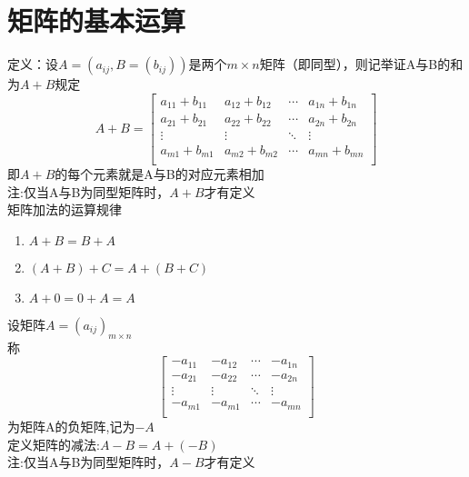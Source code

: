 \section{矩阵的基本运算}
{\color{red}定义：}设$A=(a_{ij},B=(b_{ij}))$是两个$m\times n$矩阵（即同型），则记举证A与B的和为$A+B$规定
$$
A+B=\left[ \begin{matrix}
    {{a}_{11}}+{{b}_{11}} & {{a}_{12}}+{{b}_{12}} & \cdots  & {{a}_{1n}}+{{b}_{1n}}  \\
   {{a}_{21}}+{{b}_{21}} & {{a}_{22}}+{{b}_{22}} & \cdots  & {{a}_{2n}}+{{b}_{2n}}  \\
   \vdots  & \vdots  & {\ddots} & \vdots   \\
   {{a}_{m1}}+{{b}_{m1}} & {{a}_{m2}}+{{b}_{m2}} & \cdots  & {{a}_{mn}}+{{b}_{mn}}  \\      
\end{matrix} \right]
$$
即$A+B$的每个元素就是A与B的对应元素相加\\
{\color{red}注:\quad}仅当A与B为同型矩阵时，$A+B$才有定义\\
矩阵加法的运算规律
\begin{enumerate}
    \item{
        $A+B=B+A$
    }
    \item{
        $(A+B)+C=A+(B+C)$
    }
    \item {
        $A+0=0+A=A$
    }
\end{enumerate}
设矩阵$A=(a_{ij})_{m\times n}$\\
称
$$
\left[ \begin{matrix}
    -{{a}_{11}} & -{{a}_{12}} & \cdots  &-{{a}_{1n}}  \\
   -{{a}_{21}} & -{{a}_{22}} & \cdots  &-{{a}_{2n}}  \\
   \vdots  & \vdots  & \ddots & \vdots   \\
   -{{a}_{m1}} & -{{a}_{m1}} & \cdots  &-{{a}_{mn}}  \\    
\end{matrix} \right]
$$
为矩阵A的负矩阵,记为$-A$ \\
定义矩阵的减法:$A-B=A+(-B)$\\
{\color{red}注:\quad}仅当A与B为同型矩阵时，$A-B$才有定义\\
